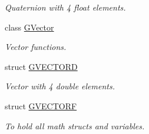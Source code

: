 \begin{DoxyCompactItemize}
\begin{DoxyCompactList}\small\item\em Quaternion with 4 float elements. \end{DoxyCompactList}\item 
class \mbox{\hyperlink{class_g_w_1_1_m_a_t_h_1_1_g_vector}{G\+Vector}}
\begin{DoxyCompactList}\small\item\em Vector functions. \end{DoxyCompactList}\item 
struct \mbox{\hyperlink{struct_g_w_1_1_m_a_t_h_1_1_g_v_e_c_t_o_r_d}{G\+V\+E\+C\+T\+O\+RD}}
\begin{DoxyCompactList}\small\item\em Vector with 4 double elements. \end{DoxyCompactList}\item 
struct \mbox{\hyperlink{struct_g_w_1_1_m_a_t_h_1_1_g_v_e_c_t_o_r_f}{G\+V\+E\+C\+T\+O\+RF}}
\begin{DoxyCompactList}\small\item\em To hold all math structs and variables. \end{DoxyCompactList}\end{DoxyCompactItemize}
